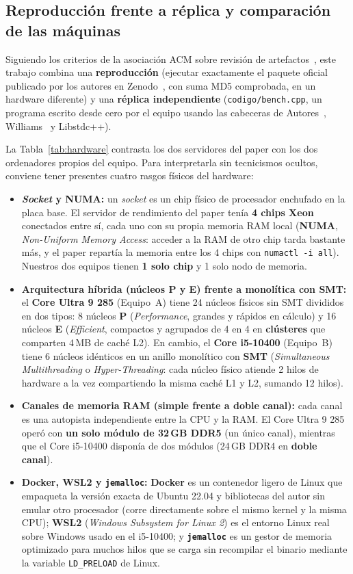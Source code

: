 \documentclass[11pt,a4paper]{article}
\begin{document}
\subsection{Reproducción frente a réplica y comparación de las máquinas}
Siguiendo los criterios de la asociación ACM sobre revisión de artefactos~\cite{acm2020badging}, este trabajo combina una \textbf{reproducción} (ejecutar exactamente el paquete oficial publicado por los autores en Zenodo~\cite{dewolff2024artifact}, con suma MD5 comprobada, en un hardware diferente) y una \textbf{réplica independiente} (\texttt{codigo/bench.cpp}, un programa escrito desde cero por el equipo usando las cabeceras de Autores~\cite{dewolff2024repo}, Williams~\cite{williams2012concurrency} y Libstdc++).

La Tabla~\ref{tab:hardware} contrasta los dos servidores del paper con los dos ordenadores propios del equipo. Para interpretarla sin tecnicismos ocultos, conviene tener presentes cuatro rasgos físicos del hardware:
\begin{itemize}
  \item \textbf{\emph{Socket} y NUMA:} un \emph{socket} es un chip físico de procesador enchufado en la placa base. El servidor de rendimiento del paper tenía \textbf{4 chips Xeon} conectados entre sí, cada uno con su propia memoria RAM local (\textbf{NUMA}, \emph{Non-Uniform Memory Access}: acceder a la RAM de otro chip tarda bastante más, y el paper repartía la memoria entre los 4 chips con \texttt{numactl -i all}). Nuestros dos equipos tienen \textbf{1 solo chip} y 1 solo nodo de memoria.
  \item \textbf{Arquitectura híbrida (núcleos P y E) frente a monolítica con SMT:} el \textbf{Core Ultra 9 285} (Equipo~A) tiene 24 núcleos físicos sin SMT divididos en dos tipos: 8 núcleos \textbf{P} (\emph{Performance}, grandes y rápidos en cálculo) y 16 núcleos \textbf{E} (\emph{Efficient}, compactos y agrupados de 4 en 4 en \textbf{clústeres} que comparten 4\,MB de caché L2). En cambio, el \textbf{Core i5-10400} (Equipo~B) tiene 6 núcleos idénticos en un anillo monolítico con \textbf{SMT} (\emph{Simultaneous Multithreading} o \emph{Hyper-Threading}: cada núcleo físico atiende 2 hilos de hardware a la vez compartiendo la misma caché L1 y L2, sumando 12 hilos).
  \item \textbf{Canales de memoria RAM (simple frente a doble canal):} cada canal es una autopista independiente entre la CPU y la RAM. El Core Ultra 9 285 operó con \textbf{un solo módulo de 32\,GB DDR5} (un único canal), mientras que el Core i5-10400 disponía de dos módulos (24\,GB DDR4 en \textbf{doble canal}).
  \item \textbf{Docker, WSL2 y \texttt{jemalloc}:} \textbf{Docker} es un contenedor ligero de Linux que empaqueta la versión exacta de Ubuntu 22.04 y bibliotecas del autor sin emular otro procesador (corre directamente sobre el mismo kernel y la misma CPU); \textbf{WSL2} (\emph{Windows Subsystem for Linux 2}) es el entorno Linux real sobre Windows usado en el i5-10400; y \textbf{\texttt{jemalloc}} es un gestor de memoria optimizado para muchos hilos que se carga sin recompilar el binario mediante la variable \texttt{LD\_PRELOAD} de Linux.
\end{itemize}
\end{document}
